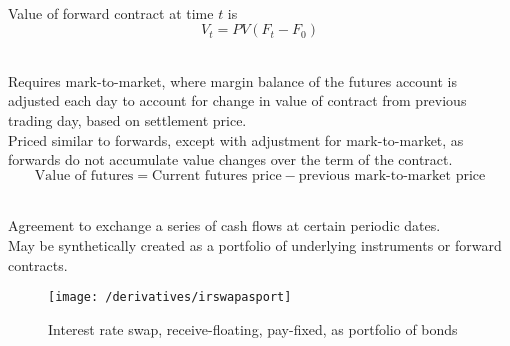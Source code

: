 \begin{method} \\
Value of forward contract at time $t$ is
\begin{equation}
V_t = PV(F_t - F_0) \nonumber
\end{equation}
\end{method}

\begin{remark} \\
Requires mark-to-market, where margin balance of the futures account is adjusted each day to account for change in value of contract from previous trading day, based on settlement price.\\
Priced similar to forwards, except with adjustment for mark-to-market, as forwards do not accumulate value changes over the term of the contract.
\begin{equation}
\text{Value of futures} = \text{Current futures price} - \text{previous mark-to-market price} \nonumber
\end{equation}
\end{remark}

\begin{remark} \\
Agreement to exchange a series of cash flows at certain periodic dates.\\
May be synthetically created as a portfolio of underlying instruments or forward contracts.
\end{remark}

\begin{figure}[H]
\centering
\texttt{[image: /derivatives/irswapasport]}
\caption{Interest rate swap, receive-floating, pay-fixed, as portfolio of bonds}
\end{figure}

